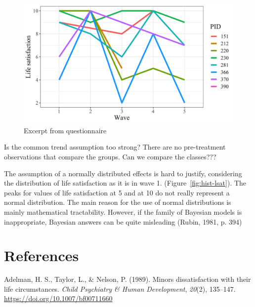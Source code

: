 \documentclass[a4, 12pt]{article}
\begin{document}
\begin{figure}[H]

{\centering \includegraphics[width=0.8\linewidth,]{../figures/random_lsat} 

}

\caption{Excerpt from questionnaire}\label{fig:random-pid}
\end{figure}

Is the common trend assumption too strong? There are no pre-treatment observations that compare the groups. Can we compare the classes???

The assumption of a normally distributed effects is hard to justify, considering the distribution of life satisfaction as it is in wave 1. (Figure~\ref{fig:hist-lsat}). The peaks for values of life satisfaction at 5 and at 10 do not really represent a normal distribution. The main reason for the use of normal distributions is mainly mathematical tractability. However, if the family of Bayesian models is inappropriate, Bayesian answers can be quite misleading (Rubin, 1981, p. 394)

\clearpage

\hypertarget{references}{%
\section*{References}\label{references}}

\singlespacing

\setlength{\parindent}{-0.5in}
\setlength{\leftskip}{0.5in}
\setlength{\parskip}{8pt}

\noindent

\hypertarget{refs}{}
\leavevmode\hypertarget{ref-Adelman1989}{}%
Adelman, H. S., Taylor, L., \& Nelson, P. (1989). Minors dissatisfaction with their life circumstances. \emph{Child Psychiatry \& Human Development}, \emph{20}(2), 135--147. \url{https://doi.org/10.1007/bf00711660}
\end{document}

